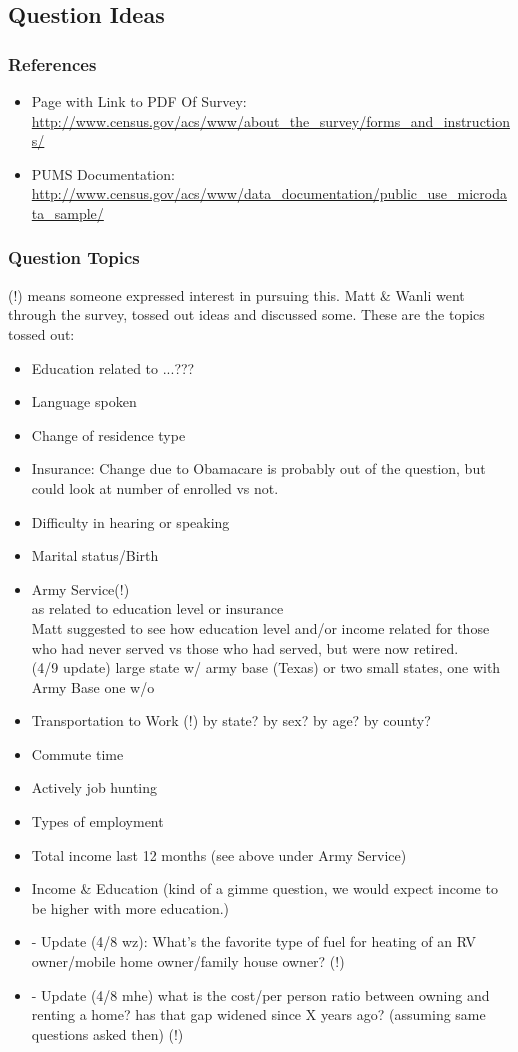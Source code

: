 \documentclass{article}
\begin{document}
\subsection{Question Ideas}
\subsubsection{References}
\begin{itemize}
\item Page with Link to PDF Of Survey: \url{http://www.census.gov/acs/www/about_the_survey/forms_and_instructions/}
\item PUMS Documentation: \url{http://www.census.gov/acs/www/data_documentation/public_use_microdata_sample/}
\end{itemize}

\subsubsection{Question Topics}
(!) means someone expressed interest in pursuing this. Matt \& Wanli went through the survey, tossed out ideas and discussed some. These are the topics tossed out:

\begin{itemize}
\item Education related to ...???
\item Language spoken
\item Change of residence type
\item Insurance: Change due to Obamacare is probably out of the question, but could look at number of enrolled vs not.
\item Difficulty in hearing or speaking
\item Marital status/Birth
\item Army Service(!)\\
  as related to education level or insurance\\
  Matt suggested to see how education level and/or income related for those who had never served vs those who had served, but were now retired.\\
  (4/9 update) large state w/ army base (Texas) or two small states, one with Army Base one w/o
\item Transportation to Work (!)
  by state? by sex? by age? by county? 
\item Commute time
\item Actively job hunting
\item Types of employment
\item Total income last 12 months (see above under Army Service)
\item Income \& Education (kind of a gimme question, we would expect income to be higher with more education.)
\item - Update (4/8 wz): What's the favorite type of fuel for heating of an RV owner/mobile home owner/family house owner? (!)
\item - Update (4/8 mhe) what is the cost/per person ratio between owning and renting a home? has that gap widened since X years ago? (assuming same questions asked then) (!)
\end{itemize}
\end{document}
